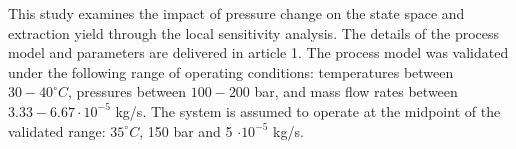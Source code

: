 \documentclass[../Article_Sensitivity_Analsysis.tex]{subfiles}
\begin{document}
	
	\label{CH: Results}
	
	
	This study examines the impact of pressure change on the state space and extraction yield through the local sensitivity analysis. The details of the process model and parameters are delivered in {\color{red}article 1}. The process model was validated under the following range of operating conditions: temperatures between $30 - 40^\circ C$, pressures between $100 - 200$ bar, and mass flow rates between $3.33-6.67 \cdot 10^{-5}$ kg/s. The system is assumed to operate at the midpoint of the validated range: $35^\circ C$, 150 bar and 5 $\cdot 10^{-5}$ kg/s.
	
        
    
    
	
\end{document}
